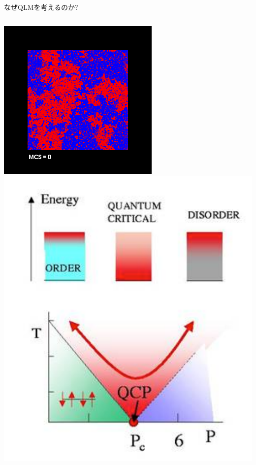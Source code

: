 \begin{frame}{なぜQLMを考えるのか?}
  \begin{columns}[T]
    \begin{column}{.2\textwidth}
      \includegraphics[width=\textwidth]{ising-tc.png} \\
      \includegraphics[width=\textwidth]{qcp.pdf}

\end{column}
\end{columns}
\end{frame}
